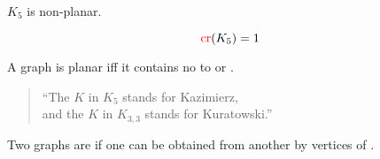 \begin{frame}{}
  \begin{theorem}
    $K_{5}$ is non-planar.
  \end{theorem}

  \pause

  \pause
  \vspace{-0.60cm}
  \[
    \textcolor{red}{\text{cr}}(K_{5}) = 1
  \]
\end{frame}

\begin{frame}{}
  \begin{theorem}
    A graph is planar iff it contains no 
     to  or .
  \end{theorem}

  \pause

  \pause
  \begin{quote}
    \begin{center}
      ``The $K$ in $K_{5}$ stands for Kazimierz,\\
      and the $K$ in $K_{3, 3}$ stands for Kuratowski.''
    \end{center}
  \end{quote}
\end{frame}

\begin{frame}{}
  \begin{definition}[Homeomorphic]
    Two graphs are  if
    one can be obtained from another by 
    vertices of .
  \end{definition}

  \pause
  \begin{columns}
  \end{columns}
\end{frame}

